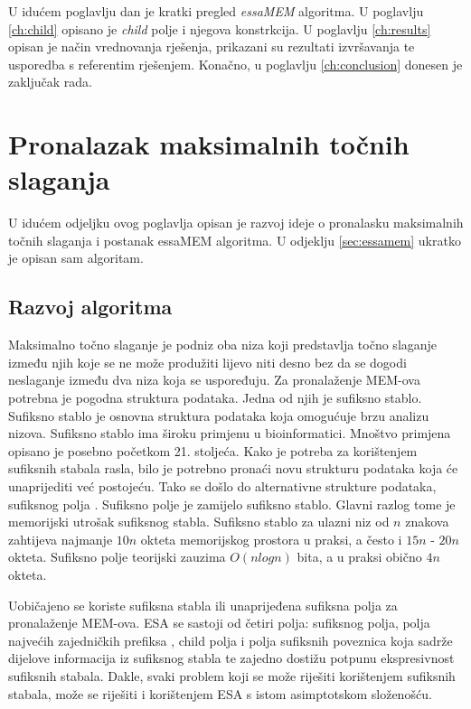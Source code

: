 \documentclass[times, utf8, seminar, numeric]{fer}
\begin{document}
U idućem poglavlju dan je kratki pregled \textit{essaMEM} algoritma. U poglavlju \ref{ch:child} opisano je \textit{child} polje i njegova konstrkcija. U poglavlju \ref{ch:results} opisan je način vrednovanja rješenja, prikazani su rezultati izvršavanja te usporedba s referentim rješenjem. Konačno, u poglavlju \ref{ch:conclusion} donesen je zaključak rada.

\chapter{Pronalazak maksimalnih točnih slaganja} 
\label{ch:mems}

U idućem odjeljku ovog poglavlja opisan je razvoj ideje o pronalasku maksimalnih točnih slaganja i postanak essaMEM algoritma. U odjeklju \ref{sec:essamem} ukratko je opisan sam algoritam.

\section{Razvoj algoritma}
\label{sec:development}

Maksimalno točno slaganje  je podniz oba niza koji predstavlja točno slaganje između njih koje se ne može produžiti lijevo niti desno bez da se dogodi neslaganje između dva niza koja se uspoređuju. Za pronalaženje MEM-ova potrebna je pogodna struktura podataka. Jedna od njih je sufiksno stablo. Sufiksno stablo je osnovna struktura podataka koja omogućuje brzu analizu nizova. Sufiksno stablo ima široku primjenu u bioinformatici. Mnoštvo primjena opisano je posebno početkom 21. stoljeća. Kako je potreba za korištenjem sufiksnih stabala rasla, bilo je potrebno pronaći novu strukturu podataka koja će unaprijediti već postojeću. Tako se došlo do alternativne strukture podataka, sufiksnog polja . Sufiksno polje je zamijelo sufiksno stablo. Glavni razlog tome je memorijski utrošak sufiksnog stabla. Sufiksno stablo za ulazni niz od $n$ znakova zahtijeva najmanje $10n$ okteta memorijskog prostora u praksi, a često i $15n$ - $20n$ okteta. Sufiksno polje teorijski zauzima $O(n log n)$ bita, a u praksi obično $4n$ okteta.

Uobičajeno se koriste sufiksna stabla ili unaprijeđena sufiksna polja  za pronalaženje MEM-ova. ESA se sastoji od četiri polja: sufiksnog polja, polja najvećih zajedničkih prefiksa , child polja i polja sufiksnih poveznica  koja sadrže dijelove informacija iz sufiksnog stabla te zajedno dostižu potpunu ekspresivnost sufiksnih stabala. Dakle, svaki problem koji se može riješiti korištenjem sufiksnih stabala, može se riješiti i korištenjem ESA s istom asimptotskom složenošću.
\end{document}
